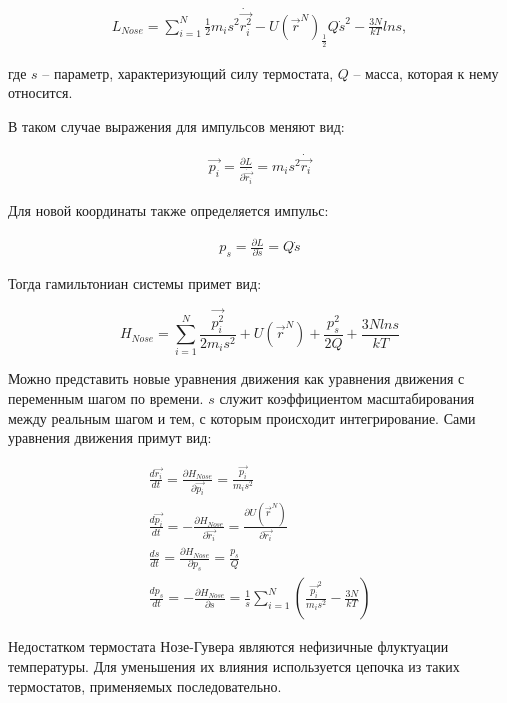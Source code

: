 \begin{align}
    L_{Nose} = \sum_{i=1}^{N} \frac{1}{2} m_i s^2 \dot{\vec{r_i^2}} - U(\vec{r}^N) _ \frac{1}{2}Q \dot{s}^2 - \frac{3N}{kT} ln s,
\end{align}

где $s$ \--- параметр, характеризующий силу термостата, $Q$ \--- масса, которая к нему относится. 

В таком случае выражения для импульсов меняют вид:

\begin{align}
    \vec{p_i} = \frac{\partial L}{\partial \dot{\vec{r_i}}} = m_i s^2 \dot{\vec{r_i}}
\end{align}

Для новой координаты также определяется импульс:

\begin{align}
    p_s = \frac{\partial L}{\partial \dot{s}} = Q \dot{s}
\end{align}

Тогда гамильтониан системы примет вид:

\begin{equation}
    H_{Nose} = \sum_{i=1}^N \frac{\vec{p_i^2}}{2m_is^2} + U(\vec{r}^N) + \frac{p_s^2}{2Q} + \frac{3N ln s}{kT}
\end{equation}

Можно представить новые уравнения движения как уравнения движения с переменным шагом по времени. $s$ служит коэффициентом масштабирования между реальным шагом и тем, с которым происходит интегрирование. Сами уравнения движения примут вид:

\begin{subequations}
	\begin{gather}
		\frac{d\vec{r_i}}{dt} = \frac{\partial H_{Nose}}{\partial \vec{p_i}} = \frac{\vec{p_i}}{m_i s^2} \\
		\frac{d\vec{p_i}}{dt} = -\frac{\partial H_{Nose}}{\partial \vec{r_i}} = \frac{\partial U(\vec{r}^N)}{\partial \vec{r_i}} \\
		\frac{ds}{dt} = \frac{\partial H_{Nose}}{\partial p_s} = \frac{p_s}{Q} \\
		\frac{d p_s}{dt} = -\frac{\partial H_{Nose}}{\partial s} = \frac{1}{s} \sum_{i=1}^N (\frac{\vec{p_i}^2}{m_i s^2} - \frac{3N}{kT}) 
	\end{gather}
\end{subequations}

Недостатком термостата Нозе-Гувера являются нефизичные флуктуации температуры. Для уменьшения их влияния используется цепочка из таких термостатов, применяемых последовательно.

